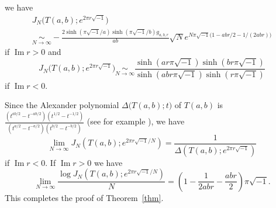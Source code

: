 \documentclass[a4paper,draft]{amsart}
\theoremstyle{plain}
\theoremstyle{definition}
\theoremstyle{remark}
\renewcommand{\Im}{\operatorname{Im}}
\numberwithin{equation}{section}
\begin{document}
we have
\begin{multline*}
  J_N\bigr(T(a,b);e^{2\pi{r}\sqrt{-1}}\bigr)
  \\
  \underset{N\to\infty}{\sim}
  -
  \frac{2\sinh(\pi\sqrt{-1}/a)\sinh(\pi\sqrt{-1}/b)g_{a,b,r}}{ab}
  \sqrt{N}
  e^{N\pi\sqrt{-1}\bigl(1-abr/2-1/(2abr)\bigr)}
\end{multline*}
if $\Im{r}>0$ and
\begin{equation*}
  J_N\bigr(T(a,b);e^{2\pi{r}\sqrt{-1}}\bigr)
  \underset{N\to\infty}{\sim}
  \frac{\sinh(ar\pi\sqrt{-1})\sinh(br\pi\sqrt{-1})}
       {\sinh(abr\pi\sqrt{-1})\sinh(r\pi\sqrt{-1})}
\end{equation*}
if $\Im{r}<0$.
\par
Since the Alexander polynomial $\Delta\bigl(T(a,b);t\bigr)$ of $T(a,b)$
is
$\frac{(t^{ab/2}-t^{-ab/2})(t^{1/2}-t^{-1/2})}
      {(t^{a/2}-t^{-a/2})(t^{b/2}-t^{-b/2})}$
(see for example \cite[Page 119]{Lickorish:1997}), we have
\begin{equation*}
  \lim_{N\to\infty}J_N\left(T(a,b);e^{2\pi{r}\sqrt{-1}/N}\right)
  =
  \frac{1}{\Delta\left(T(a,b);e^{2\pi{r}\sqrt{-1}}\right)}
\end{equation*}
if $\Im{r}<0$.
If $\Im{r}>0$ we have
\begin{equation*}
  \lim_{N\to\infty}
  \frac{\log{J_N\left(T(a,b);e^{2\pi{r}\sqrt{-1}/N}\right)}}{N}
  =
  \left(1-\dfrac{1}{2abr}-\dfrac{abr}{2}\right)\pi\sqrt{-1}.
\end{equation*}
This completes the proof of Theorem~\ref{thm}.
\end{document}
